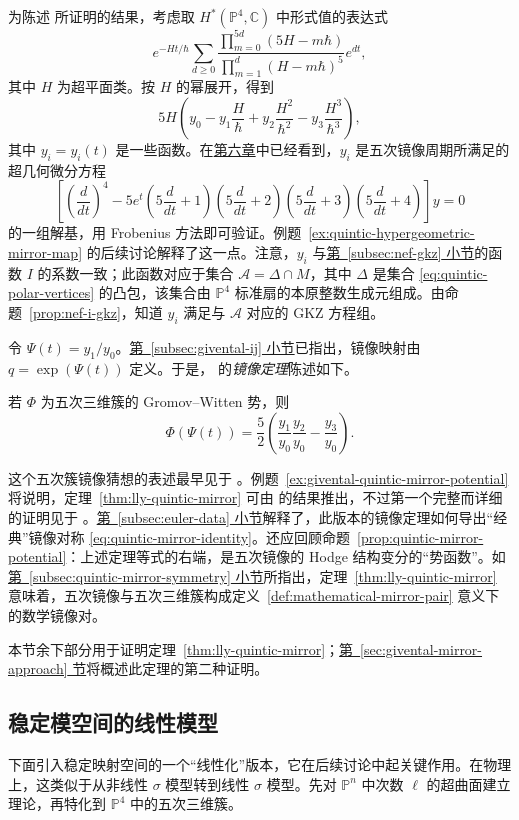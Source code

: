 为陈述  所证明的结果，考虑取 $H^*(\mathbb P^4,\mathbb C)$ 中形式值的表达式
\[
e^{-Ht/\hbar}\sum_{d\ge0}
\frac{\prod_{m=0}^{5d}(5H-m\hbar)}{\prod_{m=1}^d(H-m\hbar)^5}e^{dt},
\]
其中 $H$ 为超平面类。按 $H$ 的幂展开，得到
\[
5H\left(y_0-y_1\frac H\hbar+y_2\frac{H^2}{\hbar^2}-y_3\frac{H^3}{\hbar^3}\right),
\]
其中 $y_i=y_i(t)$ 是一些函数。在\hyperref[chap:moduli]{第六章}中已经看到，$y_i$ 是五次镜像周期所满足的超几何微分方程
\[
\left[\left(\frac d{dt}\right)^4-5e^t
\left(5\frac d{dt}+1\right)\left(5\frac d{dt}+2\right)
\left(5\frac d{dt}+3\right)\left(5\frac d{dt}+4\right)\right]y=0
\]
的一组解基，用 Frobenius 方法即可验证。例题~\ref{ex:quintic-hypergeometric-mirror-map} 的后续讨论解释了这一点。注意，$y_i$ 与\hyperref[subsec:nef-gkz]{第~\ref*{subsec:nef-gkz} 小节}的函数 $I$ 的系数一致；此函数对应于集合 $\mathcal A=\Delta\cap M$，其中 $\Delta$ 是集合 \eqref{eq:quintic-polar-vertices} 的凸包，该集合由 $\mathbb P^4$ 标准扇的本原整数生成元组成。由命题~\ref{prop:nef-i-gkz}，知道 $y_i$ 满足与 $\mathcal A$ 对应的 GKZ 方程组。

令 $\Psi(t)=y_1/y_0$。\hyperref[subsec:givental-ij]{第~\ref*{subsec:givental-ij} 小节}已指出，镜像映射由 $q=\exp(\Psi(t))$ 定义。于是， 的\emph{镜像定理}陈述如下。
\begin{theorem}\label{thm:lly-quintic-mirror}
若 $\Phi$ 为五次三维簇的 Gromov--Witten 势，则
\[
\Phi(\Psi(t))=\frac52\left(\frac{y_1}{y_0}\frac{y_2}{y_0}-\frac{y_3}{y_0}\right).
\]
\end{theorem}
这个五次簇镜像猜想的表述最早见于 。例题~\ref{ex:givental-quintic-mirror-potential} 将说明，定理~\ref{thm:lly-quintic-mirror} 可由  的结果推出，不过第一个完整而详细的证明见于 。\hyperref[subsec:euler-data]{第~\ref*{subsec:euler-data} 小节}解释了，此版本的镜像定理如何导出“经典”镜像对称 \eqref{eq:quintic-mirror-identity}。还应回顾命题~\ref{prop:quintic-mirror-potential}：上述定理等式的右端，是五次镜像的 Hodge 结构变分的“势函数”。如\hyperref[subsec:quintic-mirror-symmetry]{第~\ref*{subsec:quintic-mirror-symmetry} 小节}所指出，定理~\ref{thm:lly-quintic-mirror} 意味着，五次镜像与五次三维簇构成定义~\ref{def:mathematical-mirror-pair} 意义下的数学镜像对。

本节余下部分用于证明定理~\ref{thm:lly-quintic-mirror}；\hyperref[sec:givental-mirror-approach]{第~\ref*{sec:givental-mirror-approach} 节}将概述此定理的第二种证明。
\subsection{稳定模空间的线性模型}\label{subsec:stable-moduli-linear-models}
下面引入稳定映射空间的一个“线性化”版本，它在后续讨论中起关键作用。在物理上，这类似于从非线性 $\sigma$ 模型转到线性 $\sigma$ 模型。先对 $\mathbb P^n$ 中次数 $\ell$ 的超曲面建立理论，再特化到 $\mathbb P^4$ 中的五次三维簇。

